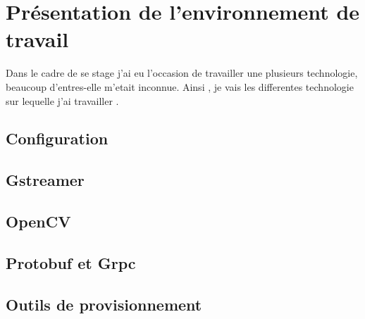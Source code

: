 \section{Présentation de l'environnement de travail}
Dans le cadre de se stage j'ai eu l'occasion de travailler une plusieurs technologie, beaucoup d'entres-elle m'etait inconnue.
Ainsi , je vais les differentes technologie sur lequelle j'ai travailler .
\subsection{Configuration}
\subsection{Gstreamer}
\subsection{OpenCV}
\subsection{Protobuf et Grpc}
\subsection{Outils de provisionnement}
